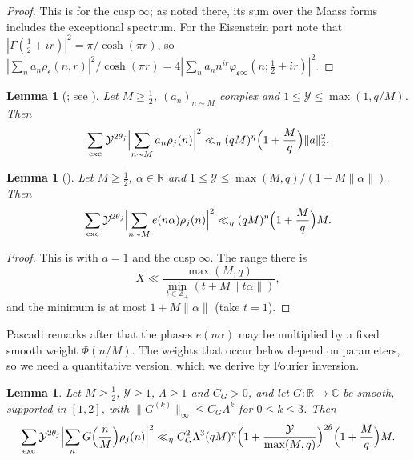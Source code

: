 \documentclass[11pt]{amsart}
\newtheorem{lemma}[theorem]{Lemma}
\theoremstyle{remark}
\theoremstyle{definition}
\numberwithin{equation}{section}
\newcommand{\Z}{\mathbb{Z}}
\newcommand{\R}{\mathbb{R}}
\newcommand{\C}{\mathbb{C}}
\newcommand{\gs}{\mathfrak{s}}
\newcommand{\exc}{\mathrm{exc}}
\begin{document}
\begin{proof}
This is \cite[Lemma~H]{Pas} for the cusp $\infty$; as noted there, its sum over the Maass forms includes the exceptional spectrum. For the Eisenstein part note that $|\Gamma(\frac12+ir)|^2=\pi/\cosh(\pi r)$, so $|\sum_na_n\rho_\gs(n,r)|^2/\cosh(\pi r)=4|\sum_na_nn^{ir}\varphi_{\gs\infty}(n;\frac12+ir)|^2$.
\end{proof}

\begin{lemma}[{\cite[Theorem~5]{DI}; see \cite[Theorem~A]{Pas}}]\label{lem:DI5}
Let $M\ge\frac12$, $(a_n)_{n\sim M}$ complex and $1\le\mathcal Y\le\max(1,q/M)$. Then
\[
\sum_{\exc}\mathcal Y^{2\theta_j}\Bigl|\sum_{n\sim M}a_n\rho_j(n)\Bigr|^2\ll_\eta(qM)^\eta\Bigl(1+\frac Mq\Bigr)\|a\|_2^2.
\]
\end{lemma}

\begin{lemma}[{\cite[Theorem~2]{Pas}}]\label{lem:Pas}
Let $M\ge\frac12$, $\alpha\in\R$ and $1\le\mathcal Y\le\max(M,q)/(1+M\|\alpha\|)$. Then
\[
\sum_{\exc}\mathcal Y^{2\theta_j}\Bigl|\sum_{n\sim M}e(n\alpha)\rho_j(n)\Bigr|^2\ll_\eta(qM)^\eta\Bigl(1+\frac Mq\Bigr)M.
\]
\end{lemma}

\begin{proof}
This is \cite[Theorem~2]{Pas} with $a=1$ and the cusp $\infty$. The range there is
\[
X\ll\frac{\max(M,q)}{\min_{t\in\Z_+}(t+M\|t\alpha\|)},
\]
and the minimum is at most $1+M\|\alpha\|$ (take $t=1$).
\end{proof}

Pascadi remarks after \cite[Theorem~2]{Pas} that the phases $e(n\alpha)$ may be multiplied by a fixed smooth weight $\Phi(n/M)$. The weights that occur below depend on parameters, so we need a quantitative version, which we derive by Fourier inversion.

\begin{lemma}\label{lem:smooth}
Let $M\ge\frac12$, $\mathcal Y\ge1$, $\Lambda\ge1$ and $C_G>0$, and let $G:\R\to\C$ be smooth, supported in $[1,2]$, with $\|G^{(k)}\|_\infty\le C_G\Lambda^k$ for $0\le k\le3$. Then
\[
\sum_{\exc}\mathcal Y^{2\theta_j}\Bigl|\sum_nG\Bigl(\frac nM\Bigr)\rho_j(n)\Bigr|^2\ll_\eta C_G^2\Lambda^3(qM)^\eta\Bigl(1+\frac{\mathcal Y}{\max(M,q)}\Bigr)^{2\theta}\Bigl(1+\frac Mq\Bigr)M.
\]
\end{lemma}
\end{document}
